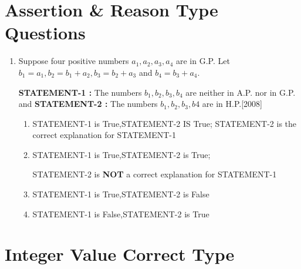 \documentclass[journal,12pt,twocolumn]{IEEEtran}
\theoremstyle{remark}
\begin{document}
\section{\textbf{Assertion \& Reason Type Questions}}
\begin{enumerate}
    

\item Suppose four positive numbers $a_{1},a_{2},a_{3},a_{4}$ are in G.P. Let $b_{1} = a_{1}, b_{2} = b_{1} + a_{2}, b_{3} = b_{2} + a_{3}$ and $b_{4} = b_{3} + a_{4}$.

\textbf{STATEMENT-1 :} The numbers $b_{1},b_{2},b_{3},b_{4}$ are neither in A.P. nor in G.P. and \textbf{STATEMENT-2 :} The numbers $b_{1},b_{2},b_{3},b{4}$ are in H.P.\hfill[2008]

\begin{enumerate}
    

\item STATEMENT-1 is True,STATEMENT-2 IS True; STATEMENT-2 is the correct explanation for STATEMENT-1

\item STATEMENT-1 is True,STATEMENT-2 is True;

STATEMENT-2 is \textbf{NOT} a correct explanation for STATEMENT-1

\item STATEMENT-1 is True,STATEMENT-2 is False

\item STATEMENT-1 is False,STATEMENT-2 is True
\end{enumerate}
\end{enumerate}
\section{\textbf{Integer Value Correct Type}}
\end{document}
